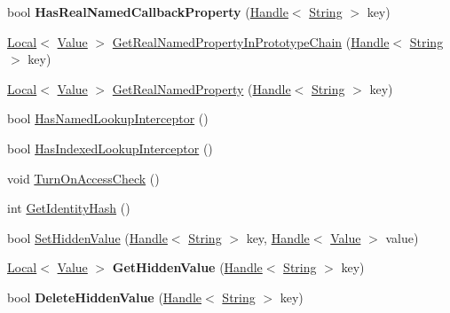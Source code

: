 \begin{DoxyCompactItemize}
\item 
\hypertarget{classv8_1_1_object_aa501acb241c3b3a941b9f48c23b1e1cd}{}bool {\bfseries Has\+Real\+Named\+Callback\+Property} (\hyperlink{classv8_1_1_handle}{Handle}$<$ \hyperlink{classv8_1_1_string}{String} $>$ key)\label{classv8_1_1_object_aa501acb241c3b3a941b9f48c23b1e1cd}

\item 
\hyperlink{classv8_1_1_local}{Local}$<$ \hyperlink{classv8_1_1_value}{Value} $>$ \hyperlink{classv8_1_1_object_a36273f157697ff5e8e776a1461755182}{Get\+Real\+Named\+Property\+In\+Prototype\+Chain} (\hyperlink{classv8_1_1_handle}{Handle}$<$ \hyperlink{classv8_1_1_string}{String} $>$ key)
\item 
\hyperlink{classv8_1_1_local}{Local}$<$ \hyperlink{classv8_1_1_value}{Value} $>$ \hyperlink{classv8_1_1_object_a0eeeb35c6dc002a8359ebc445a49e964}{Get\+Real\+Named\+Property} (\hyperlink{classv8_1_1_handle}{Handle}$<$ \hyperlink{classv8_1_1_string}{String} $>$ key)
\item 
bool \hyperlink{classv8_1_1_object_a1e96fcb9ee17101c0299ec68f2cf8610}{Has\+Named\+Lookup\+Interceptor} ()
\item 
bool \hyperlink{classv8_1_1_object_a278913bcd203434870ce5184a538a9af}{Has\+Indexed\+Lookup\+Interceptor} ()
\item 
void \hyperlink{classv8_1_1_object_a6e9fe342c0f77995defa6b479d01a3bd}{Turn\+On\+Access\+Check} ()
\item 
int \hyperlink{classv8_1_1_object_ac1ece41e81a499920ec3a2a3471653bc}{Get\+Identity\+Hash} ()
\item 
bool \hyperlink{classv8_1_1_object_a2200482b09feb914dc91d8256671f7f0}{Set\+Hidden\+Value} (\hyperlink{classv8_1_1_handle}{Handle}$<$ \hyperlink{classv8_1_1_string}{String} $>$ key, \hyperlink{classv8_1_1_handle}{Handle}$<$ \hyperlink{classv8_1_1_value}{Value} $>$ value)
\item 
\hypertarget{classv8_1_1_object_a0fb148558e1749b04a2e13b2c9fa4441}{}\hyperlink{classv8_1_1_local}{Local}$<$ \hyperlink{classv8_1_1_value}{Value} $>$ {\bfseries Get\+Hidden\+Value} (\hyperlink{classv8_1_1_handle}{Handle}$<$ \hyperlink{classv8_1_1_string}{String} $>$ key)\label{classv8_1_1_object_a0fb148558e1749b04a2e13b2c9fa4441}

\item 
\hypertarget{classv8_1_1_object_ab1d274da1949b1f68087728760ee4172}{}bool {\bfseries Delete\+Hidden\+Value} (\hyperlink{classv8_1_1_handle}{Handle}$<$ \hyperlink{classv8_1_1_string}{String} $>$ key)\label{classv8_1_1_object_ab1d274da1949b1f68087728760ee4172}


\end{DoxyCompactItemize}
